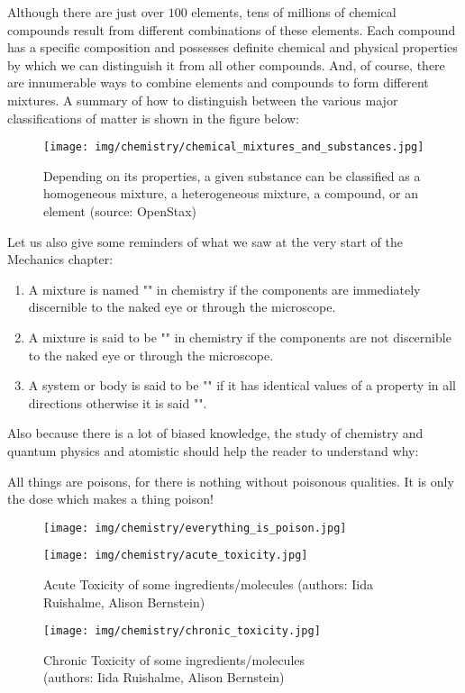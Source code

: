 	Although there are just over $100$ elements, tens of millions of chemical compounds result from different combinations of these elements. Each compound has a specific composition and possesses definite chemical and physical properties by which we can distinguish it from all other compounds. And, of course, there are innumerable ways to combine elements and compounds to form different mixtures. A summary of how to distinguish between the various major classifications of matter is shown in the figure below:
	\begin{figure}[H]
		\centering
		\texttt{[image: img/chemistry/chemical\_mixtures\_and\_substances.jpg]}
		\caption[Homogeneous mixture, heterogeneous mixture, compound or element]{Depending on its properties, a given substance can be classified as a homogeneous mixture, a heterogeneous mixture, a compound, or an element (source: OpenStax)}
	\end{figure}

	Let us also give some reminders of what we saw at the very start of the Mechanics chapter:
	\begin{enumerate}
		\item A mixture is named "" in chemistry if the components are immediately discernible to the naked eye or through the microscope.
		
		\item A mixture is said to be "" in chemistry if the components are not discernible to the naked eye or through the microscope.
		
		\item A system or body is said to be "" if it has identical values of a property in all directions otherwise it is said "".
	\end{enumerate}
	
	Also because there is a lot of biased knowledge, the study of chemistry and quantum physics and atomistic should help the reader to understand why:	
	\begin{fquote}[Paracelsus]All things are poisons, for there is nothing without poisonous qualities. It is only the dose which makes a thing poison!
 	\end{fquote}
 	\begin{figure}[H]
		\centering
		\texttt{[image: img/chemistry/everything\_is\_poison.jpg]}
	\end{figure}
	\begin{figure}[H]
		\centering
		\texttt{[image: img/chemistry/acute\_toxicity.jpg]}
		\caption[Acute Toxicity of some ingredients/molecules]{Acute Toxicity of some ingredients/molecules (authors: Iida Ruishalme, Alison Bernstein)}
	\end{figure}
	\begin{figure}[H]
		\centering
		\texttt{[image: img/chemistry/chronic\_toxicity.jpg]}
		\caption[Acute Toxicity of some ingredients/molecules]{Chronic Toxicity of some ingredients/molecules\\ (authors: Iida Ruishalme, Alison Bernstein)}
	\end{figure}
	
